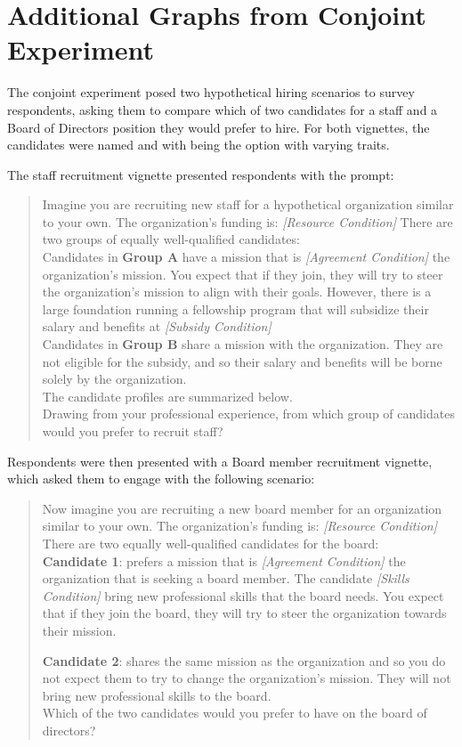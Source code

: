 \section{Additional Graphs from Conjoint Experiment}

The conjoint experiment posed two hypothetical hiring scenarios to survey respondents, asking them to compare which of two candidates for a staff and a Board of Directors position they would prefer to hire. For both vignettes, the candidates were named  and  with  being the option with varying traits.

The staff recruitment vignette presented respondents with the prompt:

\begin{quote}
Imagine you are recruiting new staff for a hypothetical organization similar to your own. The organization's funding is: \textit{{[Resource Condition]}}
There are two groups of equally well-qualified candidates:\\
Candidates in \textbf{Group A} have a mission that is \textit{{[Agreement Condition]}} the organization's mission. You expect that if they join, they will try to steer the organization's mission to align with their goals. However, there is a large foundation running a fellowship program that will subsidize their salary and benefits at \textit{{[Subsidy Condition]}}\\
Candidates in \textbf{Group B} share a mission with the organization. They are not eligible for the subsidy, and so their salary and benefits will be borne solely by the organization.\\
The candidate profiles are summarized below.\\
Drawing from your professional experience, from which group of candidates would you prefer to recruit staff?
\end{quote}

Respondents were then presented with a Board member recruitment vignette, which asked them to engage with the following scenario:

\begin{quote}
Now imagine you are recruiting a new board member for an organization similar to your own. The organization's funding is: \textit{{[Resource Condition]}}
There are two equally well-qualified candidates for the board:\\

\textbf{Candidate 1}: prefers a mission that is \textit{{[Agreement Condition]}} the organization that is seeking a board member.  The candidate \textit{{[Skills Condition]}} bring new professional skills that the board needs. You expect that if they join the board, they will try to steer the organization towards their mission.

\textbf{Candidate 2}: shares the same mission as the organization and so you do not expect them to try to change the organization's mission. They will not bring new professional skills to the board.\\
Which of the two candidates would you prefer to have on the board of directors?
\end{quote}

